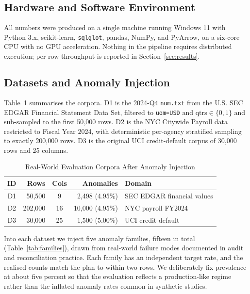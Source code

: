\documentclass{ieeeaccess}
\begin{document}
\subsection{Hardware and Software Environment}

All numbers were produced on a single machine running Windows 11 with Python
3.x, scikit-learn, \texttt{sqlglot}, pandas, NumPy, and PyArrow, on a six-core CPU
with no GPU acceleration. Nothing in the pipeline requires distributed execution;
per-row throughput is reported in Section~\ref{sec:results}.

\subsection{Datasets and Anomaly Injection}

Table~\ref{tab:corpora} summarises the corpora. D1 is the 2024-Q4
\texttt{num.txt} from the U.S. SEC EDGAR Financial Statement Data Set, filtered to
\texttt{uom=USD} and $\mathrm{qtrs}\in\{0,1\}$ and sub-sampled to the first
50{,}000 rows. D2 is the NYC Citywide Payroll data restricted to Fiscal Year 2024,
with deterministic per-agency stratified sampling to exactly 200{,}000 rows. D3 is
the original UCI credit-default corpus of 30{,}000 rows and 25 columns.

\begin{table}[tbp]
\centering
\caption{Real-World Evaluation Corpora After Anomaly Injection}
\label{tab:corpora}
\begin{tabular}{|c|r|c|r|l|}
\hline
\textbf{ID} & \textbf{Rows} & \textbf{Cols} & \textbf{Anomalies} & \textbf{Domain} \\
\hline
D1 & 50{,}500  & 9  & 2{,}498 (4.95\%)  & SEC EDGAR financial values \\ \hline
D2 & 202{,}000 & 16 & 10{,}000 (4.95\%) & NYC payroll FY2024 \\ \hline
D3 & 30{,}000  & 25 & 1{,}500 (5.00\%)  & UCI credit default \\ \hline
\end{tabular}
\end{table}

Into each dataset we inject five anomaly families, fifteen in total
(Table~\ref{tab:families}), drawn from real-world failure modes documented in
audit and reconciliation practice. Each family has an independent target rate,
and the realised counts match the plan to within two rows. We deliberately fix
prevalence at about five percent so that the evaluation reflects a production-like
regime rather than the inflated anomaly rates common in synthetic studies.
\end{document}
